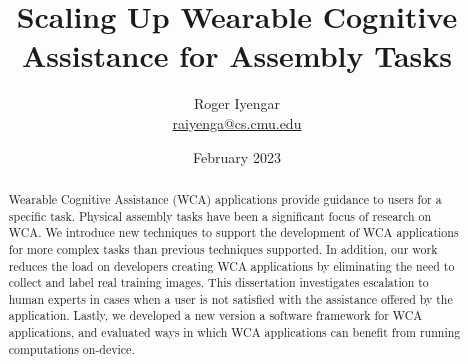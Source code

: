\documentclass[12pt]{cmuthesis}
\begin{document}
\frontmatter

\title{{\bf Scaling Up Wearable Cognitive Assistance for Assembly Tasks}}
\author{Roger Iyengar \\ \href{mailto:raiyenga@cs.cmu.edu}{raiyenga@cs.cmu.edu}}
\date{February 2023}
\trnumber{}

\vspace{3cm}





\maketitle




\begin{abstract}
  Wearable Cognitive Assistance (WCA) applications provide guidance to users for
  a specific task.
  Physical assembly tasks have been a significant focus of research on WCA.
  We introduce new techniques to support the development of WCA applications for
  more complex tasks than previous techniques supported.
  In addition, our work reduces the load on developers creating WCA applications
  by eliminating the need to collect and label real training images.
  This dissertation investigates escalation to human experts in cases when a
  user is not satisfied with the assistance offered by the application.
  Lastly, we developed a new version a software framework for WCA
  applications, and evaluated ways in which WCA applications can benefit from
  running computations on-device.
\end{abstract}
\end{document}
